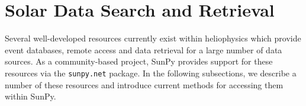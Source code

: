 \section{Solar Data Search and Retrieval}\label{sec:retrieval}

Several well-developed resources currently exist within heliophysics which provide event databases, remote access and data retrieval for a large number of data sources. As a community-based project, SunPy provides support for these resources via the \texttt{sunpy.net} package. In the following subsections, we describe a number of these resources and introduce current methods for accessing them within SunPy.






